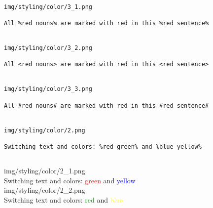 \documentclass[14pt]{article}
\begin{document}
\begin{verbatim}

img/styling/color/3_1.png

All %red nouns% are marked with red in this %red sentence%


img/styling/color/3_2.png

All <red nouns> are marked with red in this <red sentence>


img/styling/color/3_3.png

All #red nouns# are marked with red in this #red sentence#


img/styling/color/2.png

Switching text and colors: %red green% and %blue yellow%


\end{verbatim}
\noindent
img/styling/color/2\_1.png\\[.5cm]
Switching text and colors: \textcolor{red}{green} and \textcolor{blue}{yellow}\\[.5cm]
img/styling/color/2\_2.png\\[.5cm]
Switching text and colors: \textcolor{green}{red} and \textcolor{yellow}{blue}\\[.5cm]
\end{document}
